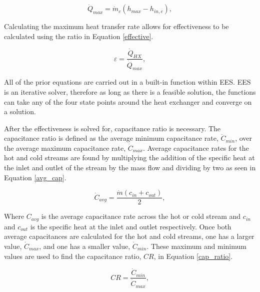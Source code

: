 \begin{equation}
    \label{heattrans_max}
    \dot{Q}_{max} = \dot{m}_{c}(h_{max}-h_{in,c}),
\end{equation}

Calculating the maximum heat transfer rate allows for effectiveness to be calculated using the ratio in Equation \ref{effective}.

\begin{equation}
    \label{effective}
    \varepsilon = \frac{\dot{Q}_{HX}}{\dot{Q}_{max}},
\end{equation}

All of the prior equations are carried out in a built-in function within EES. EES is an iterative solver, therefore as long as there is a feasible solution, the functions can take any of the four state points around the heat exchanger and converge on a solution.

After the effectiveness is solved for, capacitance ratio is necessary. The capacitance ratio is defined as the average minimum capacitance rate, $\dot{C}_{min}$, over the average maximum capacitance rate, $\dot{C}_{max}$. Average capacitance rates for the hot and cold streams are found by multiplying the addition of the specific heat at the inlet and outlet of the stream by the mass flow and dividing by two as seen in Equation \ref{avg_cap}.

\begin{equation}
    \label{avg_cap}
    \dot{C}_{avg} = \frac{\dot{m}(c_{in}+c_{out})}{2},
\end{equation}

Where $C_{avg}$ is the average capacitance rate across the hot or cold stream and $c_{in}$ and $c_{out}$ is the specific heat at the inlet and outlet respectively.  Once both average capacitances are calculated for the hot and cold streams, one has a larger value, $\dot{C}_{max}$, and one has a smaller value,  $\dot{C}_{min}$. These maximum and minimum values are used to find the capacitance ratio, $CR$, in Equation \ref{cap_ratio}.

\begin{equation}
    \label{cap_ratio}
    CR = \frac{\dot{C}_{min}}{\dot{C}_{max}},
\end{equation}

